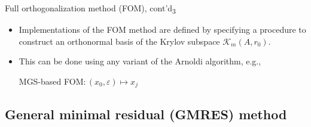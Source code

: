 \documentclass[t,usepdftitle=false]{beamer}
\begin{document}
\begin{frame}{Full orthogonalization method (FOM), cont'd\textsubscript{3}}
\begin{itemize}
\item Implementations of the FOM method are defined by specifying a procedure to construct an orthonormal basis of the Krylov subspace $\mathcal{K}_m(A,r_0)$.
\item[] This can be done using any variant of the Arnoldi algorithm, e.g.,\vspace{-.3cm}
\begin{algorithm}[H]
\small
\caption{MGS-based FOM$:(x_0,\varepsilon)\mapsto x_j$}
\begin{algorithmic}[1]
\ENDFOR
{}
\ENDIF
{}
\ENDFOR
{}
\end{algorithmic}
\end{algorithm}
\end{itemize}
\end{frame}

\subsection{General minimal residual (GMRES) method}
\end{document}
